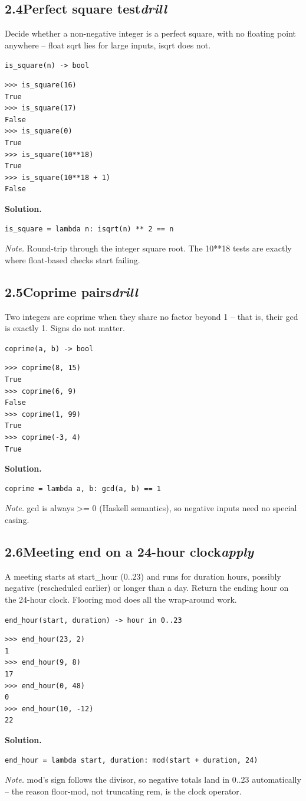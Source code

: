 \documentclass[10pt,letterpaper]{book}
\begin{document}
\subsection*{2.4\quad Perfect square test\hfill\textnormal{\textit{drill}}}
Decide whether a non-negative integer is a perfect square, with no floating point anywhere -- float sqrt lies for large inputs, isqrt does not.

\noindent\texttt{is\_square(n) -> bool}
\begin{lstlisting}[style=ex]
>>> is_square(16)
True
>>> is_square(17)
False
>>> is_square(0)
True
>>> is_square(10**18)
True
>>> is_square(10**18 + 1)
False
\end{lstlisting}
\noindent\textbf{Solution.}
\begin{lstlisting}[style=code]
is_square = lambda n: isqrt(n) ** 2 == n
\end{lstlisting}
\noindent\textit{Note.} Round-trip through the integer square root. The 10**18 tests are exactly where float-based checks start failing.

\subsection*{2.5\quad Coprime pairs\hfill\textnormal{\textit{drill}}}
Two integers are coprime when they share no factor beyond 1 -- that is, their gcd is exactly 1. Signs do not matter.

\noindent\texttt{coprime(a, b) -> bool}
\begin{lstlisting}[style=ex]
>>> coprime(8, 15)
True
>>> coprime(6, 9)
False
>>> coprime(1, 99)
True
>>> coprime(-3, 4)
True
\end{lstlisting}
\noindent\textbf{Solution.}
\begin{lstlisting}[style=code]
coprime = lambda a, b: gcd(a, b) == 1
\end{lstlisting}
\noindent\textit{Note.} gcd is always >= 0 (Haskell semantics), so negative inputs need no special casing.

\subsection*{2.6\quad Meeting end on a 24-hour clock\hfill\textnormal{\textit{apply}}}
A meeting starts at start\_hour (0..23) and runs for duration hours, possibly negative (rescheduled earlier) or longer than a day. Return the ending hour on the 24-hour clock. Flooring mod does all the wrap-around work.

\noindent\texttt{end\_hour(start, duration) -> hour in 0..23}
\begin{lstlisting}[style=ex]
>>> end_hour(23, 2)
1
>>> end_hour(9, 8)
17
>>> end_hour(0, 48)
0
>>> end_hour(10, -12)
22
\end{lstlisting}
\noindent\textbf{Solution.}
\begin{lstlisting}[style=code]
end_hour = lambda start, duration: mod(start + duration, 24)
\end{lstlisting}
\noindent\textit{Note.} mod's sign follows the divisor, so negative totals land in 0..23 automatically -- the reason floor-mod, not truncating rem, is the clock operator.
\end{document}
